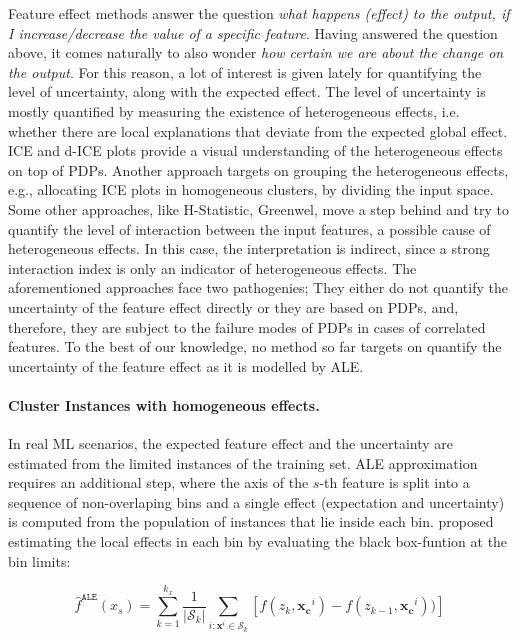 \documentclass[twoside]{article}
\newcommand{\xc}{\mathbf{x_c}}
\begin{document}
Feature effect methods answer the question \textit{what happens
  (effect) to the output, if I increase/decrease the value of a
  specific feature}. Having answered the question above, it comes
naturally to also wonder \textit{how certain we are about the change
  on the output}. For this reason, a lot of interest is given lately
for quantifying the level of uncertainty, along with the expected
effect. The level of uncertainty is mostly quantified by measuring the
existence of heterogeneous effects, i.e. whether there are local
explanations that deviate from the expected global effect. ICE and
d-ICE plots provide a visual understanding of the heterogeneous
effects on top of PDPs. Another approach targets on grouping the
heterogeneous effects, e.g., allocating ICE plots in homogeneous
clusters, by dividing the input space. Some other approaches, like
H-Statistic, Greenwel, move a step behind and try to quantify the
level of interaction between the input features, a possible cause of
heterogeneous effects. In this case, the interpretation is indirect,
since a strong interaction index is only an indicator of heterogeneous
effects. The aforementioned approaches face two pathogenies; They
either do not quantify the uncertainty of the feature effect directly
or they are based on PDPs, and, therefore, they are subject to the
failure modes of PDPs in cases of correlated features. To the best of
our knowledge, no method so far targets on quantify the uncertainty of
the feature effect as it is modelled by ALE.

\paragraph{Cluster Instances with homogeneous effects.}

In real ML scenarios, the expected feature effect and the uncertainty
are estimated from the limited instances of the training set. ALE
approximation requires an additional step, where the axis of the
\(s\)-th feature is split into a sequence of non-overlaping bins and a
single effect (expectation and uncertainty) is computed from the
population of instances that lie inside each
bin. \citep{apley2020visualizing} proposed estimating the local
effects in each bin by evaluating the black box-funtion at the bin
limits:

\begin{equation}
  \label{eq:ALE_accumulated_mean_est}
  \hat{f}^{\mathtt{ALE}}(x_s) = \sum_{k=1}^{k_x} \frac{1}{|\mathcal{S}_k|} \sum_{i:\mathbf{x}^i \in
    \mathcal{S}_k} \left [ f(z_{k}, \xc^i) - f(z_{k-1}, \xc^i)) \right ]
\end{equation}
\end{document}
